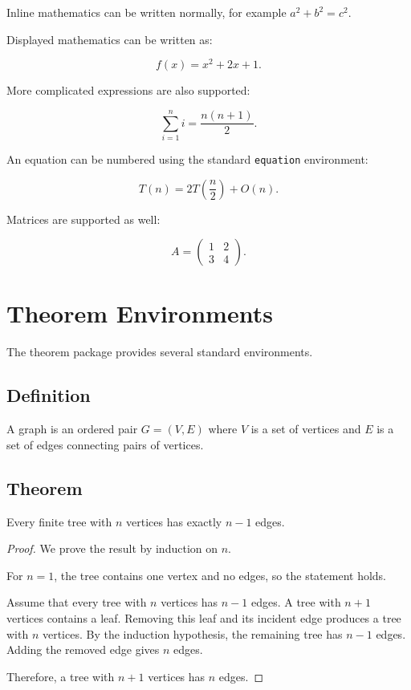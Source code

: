 \documentclass{csdept}
\begin{document}
Inline mathematics can be written normally, for example
$a^2+b^2=c^2$.

Displayed mathematics can be written as:

\[
    f(x) = x^2 + 2x + 1.
\]

More complicated expressions are also supported:

\[
    \sum_{i=1}^{n} i
    =
    \frac{n(n+1)}{2}.
\]

An equation can be numbered using the standard \texttt{equation}
environment:

\begin{equation}
    T(n) = 2T\left(\frac{n}{2}\right) + O(n).
\end{equation}

Matrices are supported as well:

\[
    A =
    \begin{pmatrix}
        1 & 2 \\
        3 & 4
    \end{pmatrix}.
\]

\section{Theorem Environments}

The theorem package provides several standard environments.

\subsection{Definition}

\begin{definition}
A graph is an ordered pair $G=(V,E)$ where $V$ is a set of
vertices and $E$ is a set of edges connecting pairs of vertices.
\end{definition}

\subsection{Theorem}

\begin{theorem}
Every finite tree with $n$ vertices has exactly $n-1$ edges.
\end{theorem}

\begin{proof}
We prove the result by induction on $n$.

For $n=1$, the tree contains one vertex and no edges, so the
statement holds.

Assume that every tree with $n$ vertices has $n-1$ edges.
A tree with $n+1$ vertices contains a leaf. Removing this leaf
and its incident edge produces a tree with $n$ vertices.
By the induction hypothesis, the remaining tree has $n-1$ edges.
Adding the removed edge gives $n$ edges.

Therefore, a tree with $n+1$ vertices has $n$ edges.
\end{proof}
\end{document}
